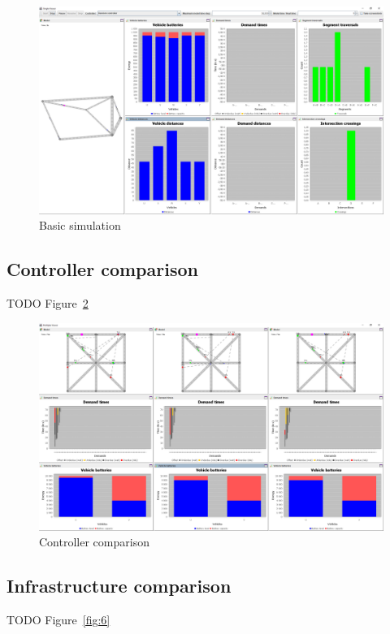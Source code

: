 \documentclass{article}
\begin{document}
    \begin{figure}[htbp]
        \centering
        \includegraphics[width=\textwidth]{../../screenshots/basic-simulation.png}
        \caption{Basic simulation}
        \label{fig:4}
    \end{figure}

    \subsection{Controller comparison}
    \label{sec:controller-comparison}
    TODO Figure~\ref{fig:5}

    \begin{figure}[htbp]
        \centering
        \includegraphics[width=\textwidth]{../../screenshots/controller-comparison.png}
        \caption{Controller comparison}
        \label{fig:5}
    \end{figure}

    \subsection{Infrastructure comparison}
    \label{sec:infrastructure-comparison}
    TODO Figure~\ref{fig:6}
\end{document}
